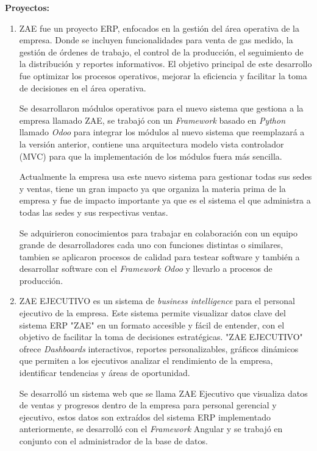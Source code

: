 \documentclass[protocolo.tex]{subfiles}
\begin{document}
\textbf{Proyectos:}
\begin{enumerate}
\item ZAE fue un proyecto ERP,  enfocados  en  la  gestión  del  área  operativa  de  la  empresa.  Donde se  incluyen  funcionalidades  para  venta de gas medido, la gestión de órdenes de trabajo, el control de la producción, el seguimiento de la distribución y reportes informativos.  El  objetivo  principal  de  este  desarrollo  fue  optimizar  los  procesos  operativos,  mejorar  la  eficiencia  y  facilitar  la  toma  de  decisiones  en  el  área  operativa.


Se desarrollaron módulos operativos para el nuevo sistema que gestiona a la empresa llamado ZAE, se
trabajó con un \textit{Framework} basado en \textit{Python} llamado \textit{Odoo} para integrar los módulos al
nuevo sistema que reemplazará a la versión anterior, contiene una arquitectura modelo vista controlador (MVC) para
que la implementación de los módulos fuera más sencilla.


Actualmente la empresa usa este nuevo sistema para gestionar todas sus sedes y ventas,
tiene un gran impacto ya que organiza la materia prima de la empresa y fue de impacto
importante ya que es el sistema el que administra a todas las sedes y sus respectivas
ventas.

Se adquirieron conocimientos para trabajar en colaboración con un equipo grande de desarrolladores cada uno
con funciones distintas o similares, tambien se aplicaron procesos de calidad para testear software y
también a desarrollar software con el \textit{Framework} \textit{Odoo} y llevarlo a procesos de producción.


\item ZAE EJECUTIVO es un sistema  de  \textit{business intelligence}  para  el  personal  ejecutivo  de  la  empresa.  Este  sistema  permite  visualizar  datos  clave  del  sistema  ERP  "ZAE"  en  un  formato  accesible  y  fácil  de  entender,  con  el  objetivo  de  facilitar  la  toma  de  decisiones  estratégicas.  "ZAE  EJECUTIVO"  ofrece \textit{Dashboards} interactivos, reportes personalizables, gráficos dinámicos que  permiten  a  los  ejecutivos  analizar  el  rendimiento  de  la  empresa,  identificar  tendencias  y  áreas  de  oportunidad.


Se desarrolló un sistema web que se llama ZAE Ejecutivo que visualiza datos de ventas y progresos dentro de la
empresa para personal gerencial y ejecutivo, estos datos son extraídos del sistema ERP
implementado anteriormente, se desarrolló con el \textit{Framework} Angular y se trabajó en
conjunto con el administrador de la base de datos.



\end{enumerate}
\end{document}
